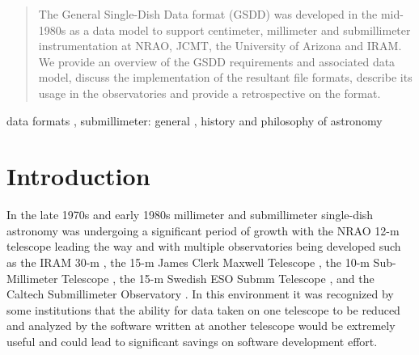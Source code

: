 \documentclass[final,authoryear,5p,times,twocolumn]{elsarticle}
\begin{document}
\begin{frontmatter}
\begin{abstract}

The General Single-Dish Data format (GSDD) was developed in the
mid-1980s as a data model to support centimeter, millimeter and submillimeter
instrumentation at NRAO, JCMT, the University of Arizona and IRAM. We
provide an overview of the GSDD
requirements and associated data model, discuss the implementation
of the resultant file formats, describe its usage in the observatories and
provide a retrospective on the format.

\end{abstract}

\begin{keyword}


data formats \sep
submillimeter: general \sep
history and philosophy of astronomy

\end{keyword}

\end{frontmatter}


\newcommand{\mnras}{MNRAS}
\newcommand{\aap}{A\&A}
\newcommand{\aaps}{A\&AS}
\newcommand{\pasp}{PASP}
\newcommand{\apj}{ApJ}
\newcommand{\apjs}{ApJS}
\newcommand{\qjras}{QJRAS}
\newcommand{\an}{Astron.\ Nach.}
\newcommand{\ijimw}{Int.\ J.\ Infrared \& Millimeter Waves}
\newcommand{\procspie}{Proc.\ SPIE}
\newcommand{\aspconf}{ASP Conf. Ser.}






\section{Introduction}

In the late 1970s and early 1980s millimeter and submillimeter
single-dish astronomy was undergoing a significant period of growth \citep[see
e.g.,][]{2013ASSP...37...39R} with the NRAO 12-m telescope leading the
way \citep[see e.g.,][]{2005ASSL..323.....G} and with multiple
observatories being developed such as the IRAM 30-m
\citep{1981MitAG..54...61B}, the 15-m James Clerk Maxwell Telescope
\citep[JCMT;][]{1985ESOC...22...63H}, the 10-m Sub-Millimeter
Telescope \citep[SMT;][]{1985ESOC...22...71W}, the 15-m Swedish ESO
Submm Telescope \citep[SEST;][]{1985ESOC...22...25D}, and the Caltech
Submillimeter Observatory \citep[CSO;][]{1988BAAS...20..690P}. In this
environment it was recognized by some institutions that the ability
for data taken on one telescope to be reduced and analyzed by the
software written at another telescope would be extremely useful and
could lead to significant savings on software development effort.
\end{document}
